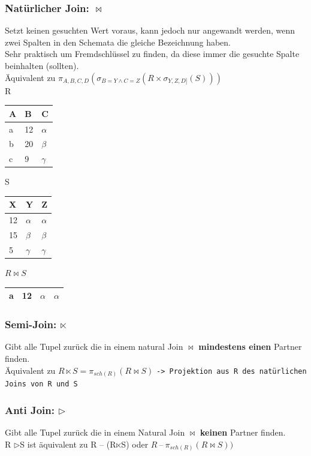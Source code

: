 \documentclass{article}
\newcommand{\ajoin}{\ensuremath{\triangleright}}
\newcommand{\sjoin}{\ensuremath{\ltimes}}
\begin{document}
 	\subsubsection{Natürlicher Join: \texorpdfstring{$\bowtie$}{}}
	Setzt keinen gesuchten Wert voraus, kann jedoch nur angewandt werden, wenn zwei Spalten in den Schemata die gleiche Bezeichnung haben. \\
 	Sehr praktisch um Fremdschlüssel zu finden, da diese immer die gesuchte Spalte beinhalten (sollten). \\
 	Äquivalent zu $\pi_{A,B,C,D}(\sigma_{B=Y \land C=Z}(R\times \sigma_{Y,Z,D]}(S)))$ \\
 	R
 	\begin{tabular}{| l | l | l |}
 		\toprule
 		A & B & C \\ \midrule
 		a & 12 & $\alpha$ \\
 		b & 20 & $\beta$ \\
 		c & 9 & $\gamma$ \\
 		\bottomrule
 \end{tabular} \hspace{0.5cm}
 S
 	\begin{tabular}{| l | l | l |}
 		\toprule
 		X & Y & Z \\ \midrule
 		12 & $\alpha$ & $\alpha$ \\
 		15 & $\beta$ & $\beta$ \\
 		5 & $\gamma$ & $\gamma$ \\
 		\bottomrule
 \end{tabular} \hspace{0.5cm}
 $R \bowtie S$
 \begin{tabular}{| l | l | l | l |}
 		\toprule
 		a & 12 & $\alpha$ & $\alpha$ \\
 		\bottomrule
 \end{tabular}
 	\subsubsection{Semi-Join: \texorpdfstring{\sjoin}{}}
 	Gibt alle Tupel zurück die in einem natural Join $\bowtie$ \textbf{mindestens einen} Partner finden. \\
 	Äquivalent zu $R\sjoin S=\pi_{sch(R)}(R \bowtie S)$ \verb|-> Projektion aus R des natürlichen Joins von R und S|
 	\subsubsection{Anti Join: \texorpdfstring{\ajoin}{}}
 	Gibt alle Tupel zurück die in einem Natural Join $\bowtie$ \textbf{keinen} Partner finden. \\
 	R \ajoin S ist äquivalent zu  R -- (R\sjoin S) oder $R\ \text{--}\ \pi_{sch(R)}(R \bowtie S))$
\end{document}
